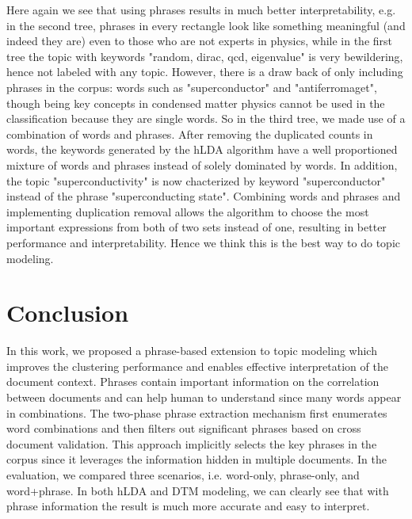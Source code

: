 \documentclass[DIV=calc, paper=letter, fontsize=10pt, twocolumn]{scrartcl}	 %
\begin{document}
Here again we see that using phrases results in much better interpretability, e.g. in the second tree, phrases in every rectangle look like something meaningful (and indeed they are) even to those who are not experts in physics, while in the first tree the topic with keywords "random, dirac, qcd, eigenvalue" is very bewildering, hence not labeled with any topic. However, there is a draw back of only including phrases in the corpus: words such as "superconductor" and "antiferromaget", though being key concepts in condensed matter physics cannot be used in the classification because they are single words. So in the third tree, we made use of a combination of words and phrases. After removing the duplicated counts in words, the keywords generated by the hLDA algorithm have a well proportioned mixture of words and phrases instead of solely dominated by words. In addition, the topic "superconductivity" is now chacterized by keyword "superconductor" instead of the phrase "superconducting state". Combining words and phrases and implementing duplication removal allows the algorithm to choose the most important expressions from both of two sets instead of one, resulting in better performance and interpretability. Hence we think this is the best way to do topic modeling.


\section*{Conclusion}
In this work, we proposed a phrase-based extension to topic modeling which improves the clustering performance and enables effective interpretation of the document context. Phrases contain important information on the correlation between documents and can help human to understand since many words appear in combinations. The two-phase phrase extraction mechanism first enumerates word combinations and then filters out significant phrases based on cross document validation. This approach implicitly selects the key phrases in the corpus since it leverages the information hidden in multiple documents. In the evaluation, we compared three scenarios, i.e. word-only, phrase-only, and word+phrase. In both hLDA and DTM modeling, we can clearly see that with phrase information the result is much more accurate and easy to interpret.

\end{document}
